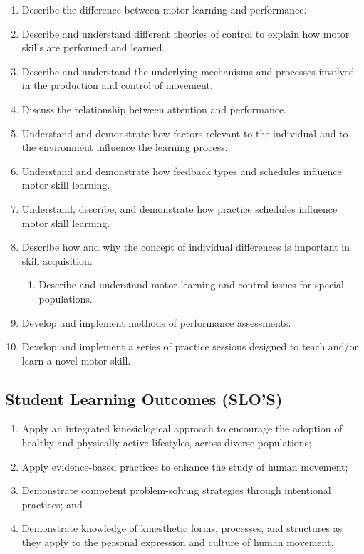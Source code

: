 \documentclass[
  letterpaper,
  DIV=11,
  numbers=noendperiod]{scrartcl}
\providecommand{\tightlist}{%
  \setlength{\itemsep}{0pt}\setlength{\parskip}{0pt}}\usepackage{longtable,booktabs,array}
\begin{document}
\begin{enumerate}
\def\labelenumi{\arabic{enumi}.}
\tightlist
\item
  Describe the difference between motor learning and performance.
\item
  Describe and understand different theories of control to explain how
  motor skills are performed and learned.
\item
  Describe and understand the underlying mechanisms and processes
  involved in the production and control of movement.
\item
  Discuss the relationship between attention and performance.
\item
  Understand and demonstrate how factors relevant to the individual and
  to the environment influence the learning process.
\item
  Understand and demonstrate how feedback types and schedules influence
  motor skill learning.
\item
  Understand, describe, and demonstrate how practice schedules influence
  motor skill learning.
\item
  Describe how and why the concept of individual differences is
  important in skill acquisition.

  \begin{enumerate}
  \def\labelenumii{\arabic{enumii}.}
  \tightlist
  \item
    Describe and understand motor learning and control issues for
    special populations.
  \end{enumerate}
\item
  Develop and implement methods of performance assessments.
\item
  Develop and implement a series of practice sessions designed to teach
  and/or learn a novel motor skill.
\end{enumerate}

\hypertarget{student-learning-outcomes-slos}{%
\subsection{Student Learning Outcomes
(SLO'S)}\label{student-learning-outcomes-slos}}

\begin{enumerate}
\def\labelenumi{\arabic{enumi}.}
\tightlist
\item
  Apply an integrated kinesiological approach to encourage the adoption
  of healthy and physically active lifestyles, across diverse
  populations;
\item
  Apply evidence-based practices to enhance the study of human movement;
\item
  Demonstrate competent problem-solving strategies through intentional
  practices; and
\item
  Demonstrate knowledge of kinesthetic forms, processes, and structures
  as they apply to the personal expression and culture of human
  movement.
\end{enumerate}
\end{document}
